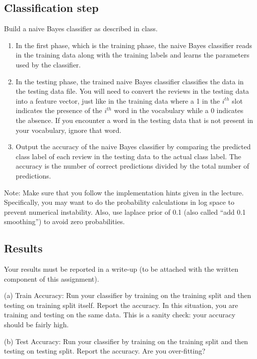 \subsection{Classification step}

Build a naive Bayes classifier as described in class.
\begin{enumerate}
\item In the first phase, which is the training phase, the naive Bayes classifier reads in the training data along with the training labels and learns the parameters used by the classifier.

\item In the testing phase, the trained naive Bayes classifier classifies the data in the testing data file. You will need to convert the reviews in the testing data into a feature vector, just like in the training data where a 1 in the $i^{th}$ slot indicates the presence of the $i^{th}$ word in the vocabulary while a 0 indicates the absence. If you encounter a word in the testing data that is not present in your vocabulary, ignore that word.

\item Output the accuracy of the naive Bayes classifier by comparing the predicted class label of each review in the testing data to the actual class label. The accuracy is the number of correct predictions divided by the total number of predictions.
\end{enumerate}

Note: Make sure that you follow the implementation hints given in the lecture. Specifically, you may want to do the probability calculations in log space to prevent numerical instability. Also, {\color{red} use laplace prior of 0.1 (also called ``add 0.1 smoothing'') to avoid zero probabilities}.

\subsection{Results}
Your results must be reported in a write-up (to be attached with the written component of this assignment).

(a) Train Accuracy: Run your classifier by training on the training split and then testing on training split itself. Report the accuracy. In this situation, you are training and testing on the same data. This is a sanity check: your accuracy should be fairly high.

(b) Test Accuracy: Run your classifier by training on the training split and then testing on testing split. Report the accuracy. Are you over-fitting?

